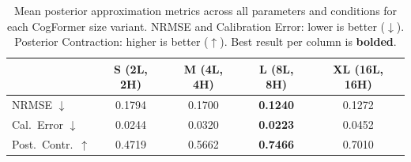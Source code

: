 \begin{table}[t]
\centering
\caption{Mean posterior approximation metrics across all parameters and conditions for each CogFormer size variant. NRMSE and Calibration Error: lower is better ($\downarrow$). Posterior Contraction: higher is better ($\uparrow$). Best result per column is \textbf{bolded}.}
\label{tab:size_comparison}
\begin{tabular}{lcccc}
\toprule
 & S (2L, 2H) & M (4L, 4H) & L (8L, 8H) & XL (16L, 16H) \\
\midrule
NRMSE $\downarrow$        & 0.1794 & 0.1700 & \textbf{0.1240} & 0.1272 \\
Cal.\ Error $\downarrow$  & 0.0244 & 0.0320 & \textbf{0.0223} & 0.0452 \\
Post.\ Contr.\ $\uparrow$ & 0.4719 & 0.5662 & \textbf{0.7466} & 0.7010 \\
\bottomrule
\end{tabular}
\end{table}
